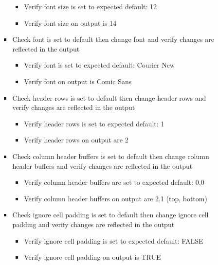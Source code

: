 \documentclass[]{article}
\providecommand{\tightlist}{%
  \setlength{\itemsep}{0pt}\setlength{\parskip}{0pt}}
\begin{document}
\begin{itemize}
\begin{itemize}
\begin{itemize}
      \begin{itemize}
      \tightlist
      \item
        Verify font size is set to expected default: 12
      \item
        Verify font size on output is 14
      \end{itemize}
    \item
      Check font is set to default then change font and verify changes
      are reflected in the output

      \begin{itemize}
      \tightlist
      \item
        Verify font is set to expected default: Courier New
      \item
        Verify font on output is Comic Sans
      \end{itemize}
    \item
      Check header rows is set to default then change header rows and
      verify changes are reflected in the output

      \begin{itemize}
      \tightlist
      \item
        Verify header rows is set to expected default: 1
      \item
        Verify header rows on output are 2
      \end{itemize}
    \item
      Check column header buffers is set to default then change column
      header buffers and verify changes are reflected in the output

      \begin{itemize}
      \tightlist
      \item
        Verify column header buffers are set to expected default: 0,0
      \item
        Verify column header buffers on output are 2,1 (top, bottom)
      \end{itemize}
    \item
      Check ignore cell padding is set to default then change ignore
      cell padding and verify changes are reflected in the output

      \begin{itemize}
      \tightlist
      \item
        Verify ignore cell padding is set to expected default: FALSE
      \item
        Verify ignore cell padding on output is TRUE
      \end{itemize}
    \end{itemize}
  \end{itemize}
\end{itemize}
\end{document}
